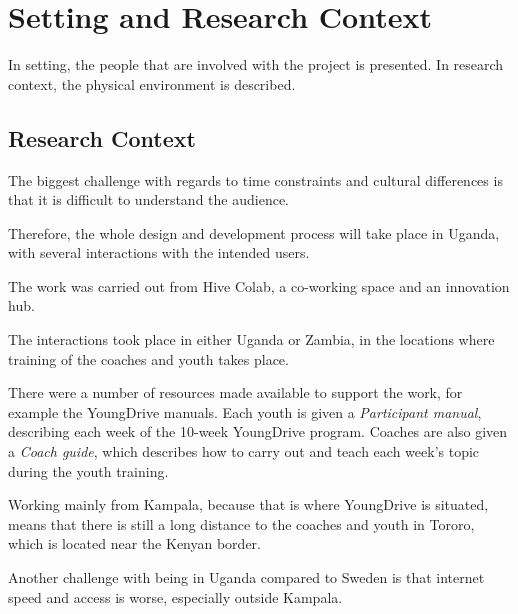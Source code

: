 \section{Setting and Research Context}

In setting, the people that are involved with the project is presented. In research context, the physical environment is described.



\subsection{Research Context} 

The biggest challenge with regards to time constraints and cultural differences is that it is difficult to understand the audience.

Therefore, the whole design and development process will take place in Uganda, with several interactions with the intended users.

The work was carried out from Hive Colab, a co-working space and an innovation hub.

The interactions took place in either Uganda or Zambia, in the locations where training of the coaches and youth takes place.

There were a number of resources made available to support the work, for example the YoungDrive manuals. Each youth is given a \textit{Participant manual}, describing each week of the 10-week YoungDrive program. Coaches are also given a \textit{Coach guide}, which describes how to carry out and teach each week's topic during the youth training.

Working mainly from Kampala, because that is where YoungDrive is situated, means that there is still a long distance to the coaches and youth in Tororo, which is located near the Kenyan border.

Another challenge with being in Uganda compared to Sweden is that internet speed and access is worse, especially outside Kampala.

